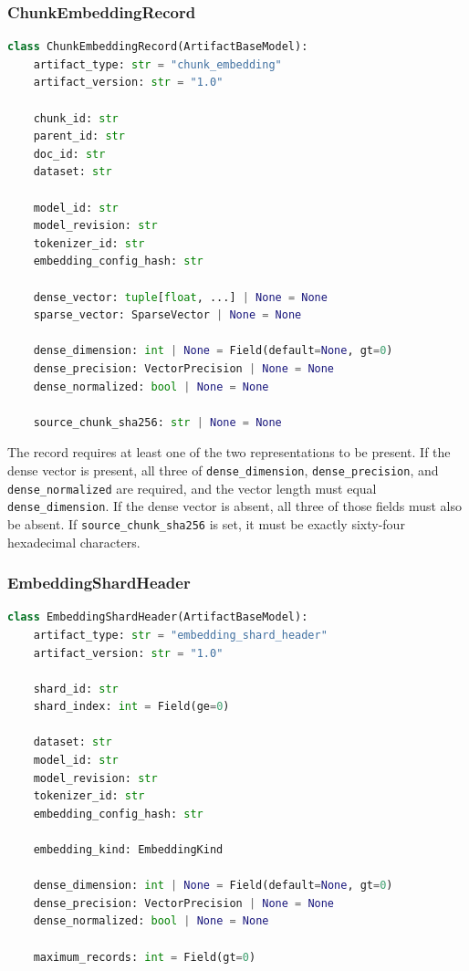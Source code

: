 \documentclass[11pt,a4paper]{article}
\begin{document}
\subsubsection{ChunkEmbeddingRecord}
\begin{lstlisting}[language=python]
class ChunkEmbeddingRecord(ArtifactBaseModel):
    artifact_type: str = "chunk_embedding"
    artifact_version: str = "1.0"

    chunk_id: str
    parent_id: str
    doc_id: str
    dataset: str

    model_id: str
    model_revision: str
    tokenizer_id: str
    embedding_config_hash: str

    dense_vector: tuple[float, ...] | None = None
    sparse_vector: SparseVector | None = None

    dense_dimension: int | None = Field(default=None, gt=0)
    dense_precision: VectorPrecision | None = None
    dense_normalized: bool | None = None

    source_chunk_sha256: str | None = None
\end{lstlisting}

The record requires at least one of the two representations to be
present. If the dense vector is present, all three of
\texttt{dense\_dimension}, \texttt{dense\_precision}, and
\texttt{dense\_normalized} are required, and the vector length must
equal \texttt{dense\_dimension}. If the dense vector is absent, all
three of those fields must also be absent. If
\texttt{source\_chunk\_sha256} is set, it must be exactly sixty-four
hexadecimal characters.

\subsubsection{EmbeddingShardHeader}
\begin{lstlisting}[language=python]
class EmbeddingShardHeader(ArtifactBaseModel):
    artifact_type: str = "embedding_shard_header"
    artifact_version: str = "1.0"

    shard_id: str
    shard_index: int = Field(ge=0)

    dataset: str
    model_id: str
    model_revision: str
    tokenizer_id: str
    embedding_config_hash: str

    embedding_kind: EmbeddingKind

    dense_dimension: int | None = Field(default=None, gt=0)
    dense_precision: VectorPrecision | None = None
    dense_normalized: bool | None = None

    maximum_records: int = Field(gt=0)
\end{lstlisting}
\end{document}
